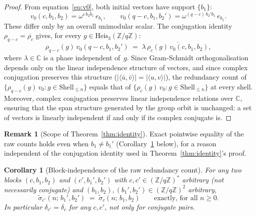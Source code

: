 \documentclass[11pt,a4paper]{article}
\newtheorem{corollary}[theorem]{Corollary}
\theoremstyle{definition}
\newtheorem{remark}[theorem]{Remark}
\newcommand{\Heis}{\mathrm{Heis}_3}
\newcommand{\ZqZ}{\mathbb{Z}/q\mathbb{Z}}
\newcommand{\Fq}{(\mathbb{Z}/q\mathbb{Z})^*}
\begin{document}
    \begin{proof}
      From equation~\eqref{eq:v0}, both initial vectors have support $\{b_1\}$:
      \[
        v_0(c,b_1,b_2) = \omega^{c\,b_2 b_1}\,e_{b_1},
        \qquad
        v_0(q-c,b_1,b_2') = \omega^{(q-c)\,b_2' b_1}\,e_{b_1}.
      \]
      These differ only by an overall unimodular scalar.
      The conjugation identity $\rho_{q-c} = \overline{\rho_c}$ gives,
      for every $g \in \Heis(\ZqZ)$:
      \[
        \rho_{q-c}(g)\,v_0(q-c,b_1,b_2')
        \;=\; \lambda\,\overline{\rho_c(g)\,v_0(c,b_1,b_2)},
      \]
      where $\lambda \in \mathbb{C}$ is a phase independent of~$g$.
      Since Gram-Schmidt orthogonalisation depends only on the
      linear independence structure of vectors, and since complex
      conjugation preserves this structure
      ($|\langle \bar u, \bar v \rangle| = |\langle u, v \rangle|$),
      the redundancy count of
      $\{\rho_{q-c}(g)\,v_0 : g \in \mathrm{Shell}_{\leq n}\}$
      equals that of
      $\{\rho_c(g)\,v_0 : g \in \mathrm{Shell}_{\leq n}\}$
      at every shell.
      Moreover, complex conjugation preserves linear independence relations
      over $\mathbb{C}$, ensuring that the span structure generated by the
      group orbit is unchanged: a set of vectors is linearly independent
      if and only if its complex conjugate is.
    \end{proof}

    \begin{remark}[Scope of Theorem~\ref{thm:identity}]
      \label{rem:scope}
      Exact pointwise equality of the raw counts holds even when
      $b_1 \neq b_1'$ (Corollary~\ref{cor:structural_equiv} below), for a
      reason independent of the conjugation identity used in
      Theorem~\ref{thm:identity}'s proof.
    \end{remark}

    \begin{corollary}[Block-independence of the raw redundancy count]
      \label{cor:structural_equiv}
      For \emph{any} two blocks $(c,b_1,b_2)$ and $(c',b_1',b_2')$ with
      $c,c' \in \Fq$ arbitrary (not necessarily conjugate) and
      $(b_1,b_2),(b_1',b_2') \in (\ZqZ)^2$ arbitrary,
      \begin{equation}
        \tilde\sigma_{c'}(n;\,b_1',b_2') \;=\; \tilde\sigma_c(n;\,b_1,b_2)
        \qquad \text{exactly, for all } n \geq 0.
        \label{eq:block_indep}
      \end{equation}
      In particular $\delta_{c'} = \delta_c$ for any $c,c'$, not only for
      conjugate pairs.
    \end{corollary}
\end{document}
